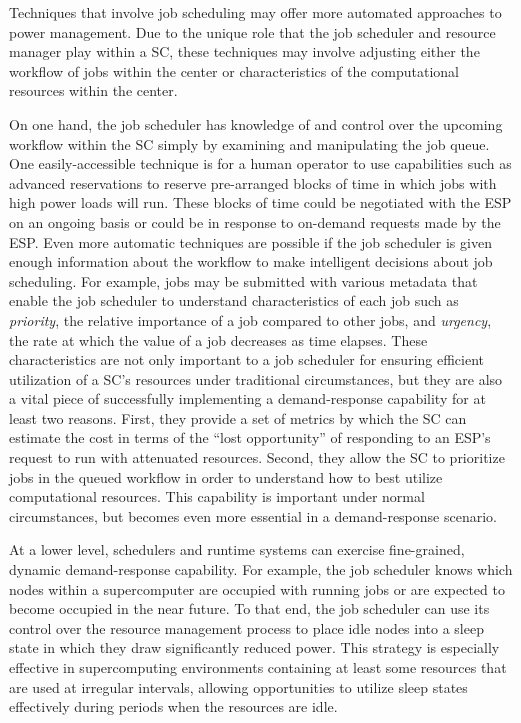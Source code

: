 Techniques that involve job scheduling may offer more automated
approaches to power management. Due to the unique role that the job
scheduler and resource manager play within a SC,
these techniques may involve adjusting either the workflow of jobs
within the center or characteristics of the computational resources
within the center.

On one hand, the job scheduler has knowledge of and control over the
upcoming workflow within the SC simply by examining
and manipulating the job queue. One easily-accessible technique is
for a human operator to use capabilities such as advanced reservations
to reserve pre-arranged blocks of time in which jobs with high power
loads will run. These blocks of time could be negotiated with the
ESP on an ongoing basis or could be in response to
on-demand requests made by the ESP. Even more
automatic techniques are possible if the job scheduler is given enough
information about the workflow to make intelligent decisions about job
scheduling. For example, jobs may be submitted with various metadata
that enable the job scheduler to understand characteristics of each
job such as \textit{priority}, the relative importance of a job
compared to other jobs, and \textit{urgency}, the rate at which the
value of a job decreases as time elapses. These characteristics are
not only important to a job scheduler for ensuring efficient
utilization of a SC's resources under traditional
circumstances, but they are also a vital piece of successfully
implementing a demand-response capability for at least two reasons.
First, they provide a set of metrics by which the SC
can estimate the cost in terms of the ``lost opportunity'' of
responding to an ESP's request to run with
attenuated resources. Second, they allow the SC to
prioritize jobs in the queued workflow in order to understand how to
best utilize computational resources. This capability is important
under normal circumstances, but becomes even more essential in a
demand-response scenario.

At a lower level, schedulers and runtime systems can exercise 
fine-grained, dynamic demand-response capability. 
For example, the job scheduler knows which
nodes within a supercomputer are occupied with running jobs or are
expected to become occupied in the near future. To that end, the job
scheduler can use its control over the resource management process to
place idle nodes into a sleep state in which they draw significantly
reduced power. This strategy is especially effective in supercomputing
environments containing at least some resources that are used at
irregular intervals, allowing opportunities to utilize sleep states
effectively during periods when the resources are idle. 

